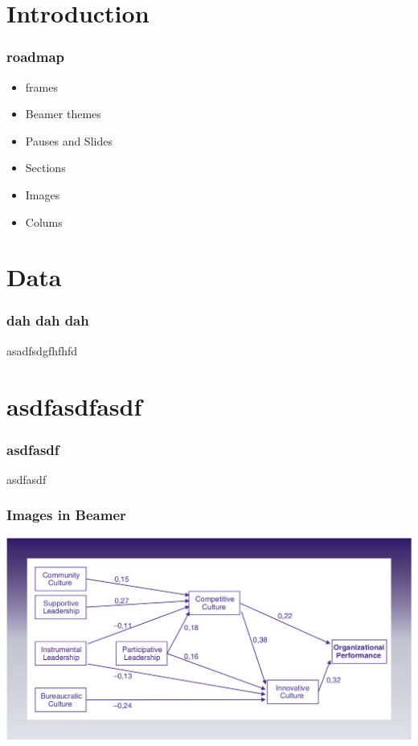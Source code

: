 



\maketitle

\section{Introduction}


\begin{frame}
\frametitle{roadmap}

\begin{itemize}
\item frames
\item Beamer themes
\item Pauses and Slides
\item Sections
\item Images
\item Colums
\end{itemize}

\end{frame}

\section{Data}

\begin{frame}
\frametitle{dah dah dah}

asadfsdgfhfhfd

\end{frame}

\section{asdfasdfasdf}

\begin{frame}
\frametitle{asdfasdf}

asdfasdf

\end{frame}



\begin{frame}
\frametitle{Images in Beamer}

\includegraphics[scale=.25]{"./image/OB/Ogbonna & Harris.jpg"}

\end{frame}

